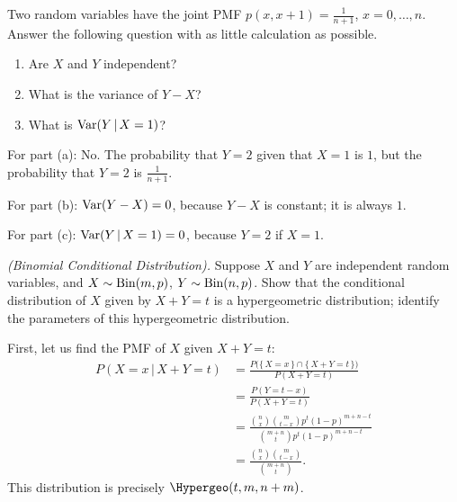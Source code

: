 \begin{problem}[Handout 15, \# 13]
  Two random variables have the joint PMF \(p(x,x+1)=\frac{1}{n+1}\),
  \(x=0,\dotsc,n\). Answer the following question with as little
  calculation as possible.
  \begin{enumerate}[label=(\alph*),noitemsep]
  \item Are \(X\) and \(Y\) independent?
  \item What is the variance of \(Y-X\)?
  \item What is \(\operatorname{Var}(Y\,|\,{X=1})\)?
  \end{enumerate}
\end{problem}
\begin{solution}
  For part (a): No. The probability that $Y=2$ given that $X=1$ is $1$, but
  the probability that $Y=2$ is $\frac{1}{n+1}$.

  For part (b): $\operatorname{Var}(Y-X) = 0$, because $Y-X$ is constant; it is
  always $1$.

  For part (c): $\operatorname{Var}(Y\,|\,X=1) = 0$, because $Y = 2$ if $X=1$.
\end{solution}

\begin{problem}[Handout 15, \# 14]
  \emph{(Binomial Conditional Distribution).} Suppose \(X\) and \(Y\) are
  independent random variables, and \(X\sim\operatorname{Bin}(m,p)\),
  \(Y\sim\operatorname{Bin}(n,p)\). Show that the conditional distribution of \(X\) given
  by \(X+Y=t\) is a hypergeometric distribution; identify the parameters of
  this hypergeometric distribution.
\end{problem}
\begin{solution}
  First, let us find the PMF of \(X\) given \(X+Y=t\):
  \begin{align*}
    P(X=x\,|\,X+Y=t)
    &=\frac{P\bigl(\{\,X=x\,\}\cap\{\,X+Y=t\,\}\bigr)}{P(X+Y=t)}\\
    &=\frac{P(Y=t-x)}{P(X+Y=t)}\\
    &=\frac{\binom{n}{x}\binom{m}{t-x}p^t(1-p)^{m+n-t}}
      {\binom{m+n}{t}p^t(1-p)^{m+n-t}}\\
    &=\frac{\binom{n}{x}\binom{m}{t-x}}{\binom{m+n}{t}}.
  \end{align*}
  This distribution is precisely \(\Hypergeo(t,m,n+m)\).
\end{solution}

